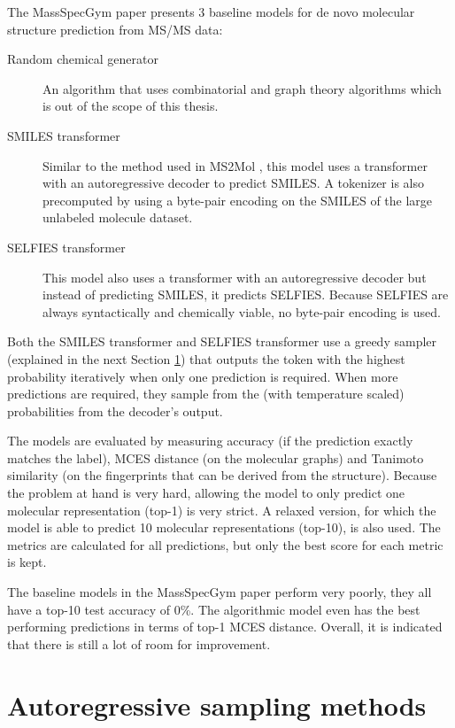 The MassSpecGym paper \cite{bushuiev2024massspecgym} presents 3 baseline models for de novo molecular structure prediction from \ac{MS/MS} data:
\begin{description}
    \item[Random chemical generator] An algorithm that uses combinatorial and graph theory algorithms which is out of the scope of this thesis.
    \item[SMILES transformer] Similar to the method used in MS2Mol \cite{butler2023ms2mol}, this model uses a transformer with an autoregressive decoder to predict SMILES. A tokenizer is also precomputed by using a byte-pair encoding on the SMILES of the large unlabeled molecule dataset.
    \item[SELFIES transformer] This model also uses a transformer with an autoregressive decoder but instead of predicting SMILES, it predicts SELFIES. Because SELFIES are always syntactically and chemically viable, no byte-pair encoding is used.
\end{description}
Both the SMILES transformer and SELFIES transformer use a greedy sampler (explained in the next Section \ref{sec:samplingmethods}) that outputs the token with the highest probability iteratively when only one prediction is required. When more predictions are required, they sample from the (with temperature scaled) probabilities from the decoder's output.

The models are evaluated by measuring accuracy (if the prediction exactly matches the label), \ac{MCES} distance (on the molecular graphs) and Tanimoto similarity (on the fingerprints that can be derived from the structure). Because the problem at hand is very hard, allowing the model to only predict one molecular representation (top-1) is very strict. A relaxed version, for which the model is able to predict 10 molecular representations (top-10), is also used. The metrics are calculated for all predictions, but only the best score for each metric is kept.

The baseline models in the MassSpecGym paper perform very poorly, they all have a top-10 test accuracy of 0\%. The algorithmic model even has the best performing predictions in terms of top-1 MCES distance. Overall, it is indicated that there is still a lot of room for improvement. 

\section{Autoregressive sampling methods}
\label{sec:samplingmethods}

